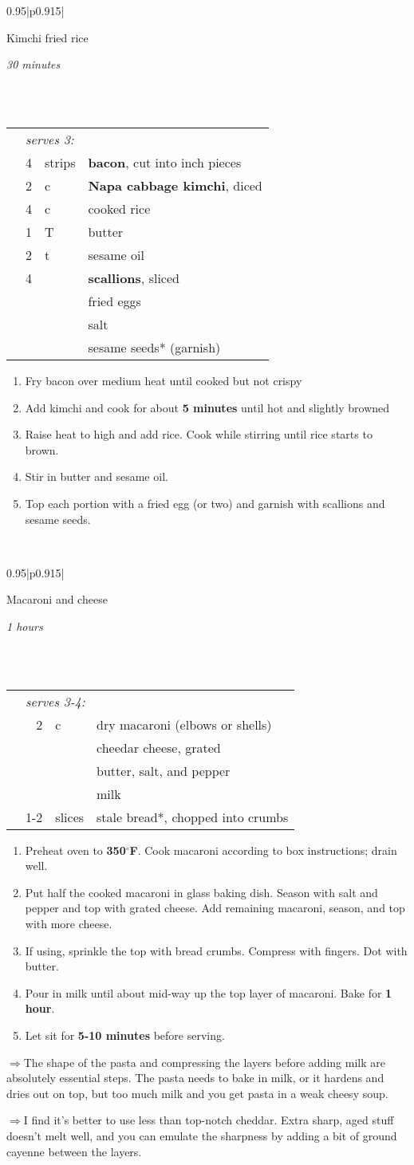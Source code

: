 \documentclass[8pt]{report}
\newcommand{\ingredmargin}{0.25cm}
\newcommand{\F}{$^\circ$F}
\newcommand{\fr}[2]{\nicefrac{#1}{#2}}
\newenvironment{recipe}[3]
  {\bigskip \bigskip 
\begin{tabular*}{0.95\textwidth}{|p{0.915\textwidth}|} \hline \vspace{0.25mm}
\begin{minipage}{0.7\textwidth}	\begin{flushleft} {\Large \textsf{#1}} \end{flushleft} \end{minipage}
\begin{minipage}{0.2\textwidth} \begin{flushright} \emph{#2} \end{flushright} \end{minipage} \\ \\ \hline
\begin{ingreds}{#3} \addcontentsline{toc}{section}{#1} \phantomsection \label{rec:#1}} 
  {\\ \hline \end{tabular*} \noindent}
\newenvironment{ingreds}[1]
  {\begin{tabular}{lrlp{0.6\textwidth}} \hspace{\ingredmargin} & \multicolumn{3}{l}{\it #1:} \\}
  {\end{tabular} \medskip}
\newcommand{\ingredsdone}{\end{ingreds}\begin{enumerate}}
\newcommand{\stepsdone}{\end{enumerate} \medskip}
\newcommand{\ingredient}[3]{\hspace{\ingredmargin} & #1 & #2 & #3 \\}
\newcommand{\tip}{$\Rightarrow$}
\begin{document}
\begin{recipe}{Kimchi fried rice}{30 minutes}{serves 3}
\index{rice!fried, kimchi} \index{kimchi fried rice} \index{korean!kimchi fried rice}
\ingredient{4}{strips}{{\bf bacon}, cut into \fr12 inch pieces}
\ingredient{2}{c}{{\bf Napa cabbage kimchi}, diced}
\ingredient{4}{c}{cooked rice}
\ingredient{1}{T}{butter}
\ingredient{2}{t}{sesame oil}
\ingredient{4}{}{{\bf scallions}, sliced}
\ingredient{}{}{fried eggs}
\ingredient{}{}{salt}
\ingredient{}{}{sesame seeds* (garnish)}
\ingredsdone
\item Fry bacon over medium heat until cooked but not crispy
\item Add kimchi and cook for about {\bf 5 minutes} until hot and slightly browned
\item Raise heat to high and add rice.  Cook while stirring until rice starts to brown.
\item Stir in butter and sesame oil.
\item Top each portion with a fried egg (or two) and garnish with scallions and sesame seeds.
\end{enumerate}
\end{recipe}


\begin{recipe}{Macaroni and cheese}{1 \fr12 hours}{serves 3-4}
\index{casseroles!macaroni and cheese} \index{macaroni and cheese}
\ingredient{2}{c}{dry macaroni (elbows or shells)}
\ingredient{}{}{cheedar cheese, grated}
\ingredient{}{}{butter, salt, and pepper}
\ingredient{}{}{milk}
\ingredient{1-2}{slices}{stale bread*, chopped into crumbs}
\ingredsdone
\item Preheat oven to {\bf 350\F}.  Cook macaroni according to box instructions; drain well.
\item Put half the cooked macaroni in glass baking dish.  Season with salt and pepper and top with grated cheese.  Add remaining macaroni, season, and top with more cheese.  
\item If using, sprinkle the top with bread crumbs.  Compress with fingers.  Dot with butter.
\item Pour in milk until about mid-way up the top layer of macaroni.  Bake for {\bf 1 hour}.
\item Let sit for {\bf 5-10 minutes} before serving.
\stepsdone
\noindent \tip The shape of the pasta and compressing the layers before adding milk are absolutely essential steps.  The pasta needs to bake in milk, or it hardens and dries out on top, but too much milk and you get pasta in a weak cheesy soup.  

\medskip \noindent \tip I find it's better to use less than top-notch cheddar.  Extra sharp, aged stuff doesn't melt well, and you can emulate the sharpness by adding a bit of ground cayenne between the layers.  
\end{recipe}
\end{document}
